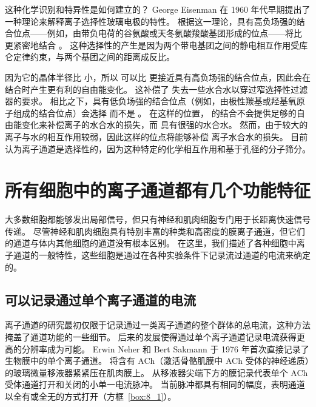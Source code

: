 这种化学识别和特异性是如何建立的？
George Eisenman 在 1960 年代早期提出了一种理论来解释离子选择性玻璃电极的特性。
根据这一理论，具有高负场强的结合位点——例如，由带负电荷的谷氨酸或天冬氨酸羧酸基团形成的位点——将比  更紧密地结合 。
这种选择性的产生是因为两个带电基团之间的静电相互作用受库仑定律约束，与两个基团之间的距离成反比。


因为它的晶体半径比  小，所以  可以比  更接近具有高负场强的结合位点，因此会在结合时产生更有利的自由能变化。
这补偿了  失去一些水合水以穿过窄选择性过滤器的要求。
相比之下，具有低负场强的结合位点（例如，由极性羰基或羟基氧原子组成的结合位点）会选择  而不是 。
在这样的位置， 的结合不会提供足够的自由能变化来补偿离子的水合水的损失，而  具有很强的水合水。
然而，由于较大的  离子与水的相互作用较弱，因此这样的位点将能够补偿  离子水合水的损失。
目前认为离子通道是选择性的，因为这种特定的化学相互作用和基于孔径的分子筛分。



\section{所有细胞中的离子通道都有几个功能特征}

大多数细胞都能够发出局部信号，但只有神经和肌肉细胞专门用于长距离快速信号传递。
尽管神经和肌肉细胞具有特别丰富的种类和高密度的膜离子通道，但它们的通道与体内其他细胞的通道没有根本区别。
在这里，我们描述了各种细胞中离子通道的一般特性，这些细胞是通过在各种实验条件下记录流过通道的电流来确定的。



\subsection{可以记录通过单个离子通道的电流}

离子通道的研究最初仅限于记录通过一类离子通道的整个群体的总电流，这种方法掩盖了通道功能的一些细节。
后来的发展使得通过单个离子通道记录电流获得更高的分辨率成为可能。
Erwin Neher 和 Bert Sakmann 于 1976 年首次直接记录了生物膜中的单个离子通道。
将含有 ACh（激活骨骼肌膜中 ACh 受体的神经递质）的玻璃微量移液器紧紧压在肌肉膜上。
从移液器尖端下方的膜记录代表单个 ACh 受体通道打开和关闭的小单一电流脉冲。
当前脉冲都具有相同的幅度，表明通道以全有或全无的方式打开（方框~\ref{box:8_1}）。


